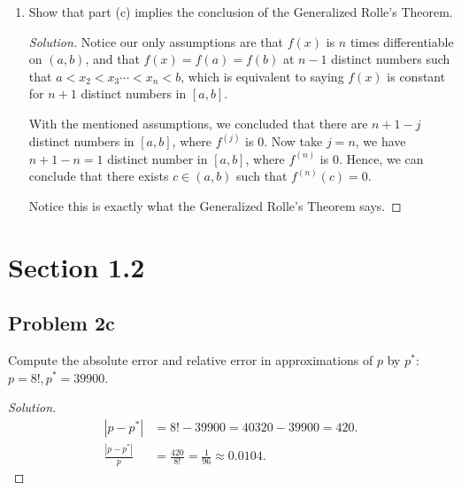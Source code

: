 \documentclass{article}
\begin{document}
\begin{enumerate}[label=\alph*.]
\begin{proof}[Solution]
        Hence, by induction, we can conclude that for each $j = 1, 2, \dots, n$, there are $n+1-j$
        distinct numbers in $[a,b]$, where $f^{(j)}$ is 0.
    \end{proof}

    \item  Show that part (c) implies the conclusion of the Generalized Rolle's Theorem.
    
    \begin{proof}[Solution]
        Notice our only assumptions are that $f(x)$ is $n$ times differentiable on $(a, b)$, and that 
        $f(x) = f(a) = f(b)$ at $n - 1$ distinct numbers such that $a < x_2 < x_3 \cdots < x_n < b$, 
        which is equivalent to saying $f(x)$ is constant for $n+1$ distinct numbers in $[a,b]$. 

        With the mentioned assumptions, we concluded that there are $n+1-j$ distinct numbers in 
        $[a,b]$, where $f^{(j)}$ is 0. Now take $j = n$, we have $n+1-n = 1$ distinct number in 
        $[a,b]$, where $f^{(n)}$ is 0. Hence, we can conclude that there exists $c \in (a,b)$ such 
        that $f^{(n)}(c) = 0$.

        Notice this is exactly what the Generalized Rolle's Theorem says.
    \end{proof}


\end{enumerate}

\section*{Section 1.2}
\subsection*{Problem 2c}
Compute the absolute error and relative error in approximations of $p$ by $p^*$: $p = 8!, p^* = 
39900$.

\begin{proof}[Solution]
    \begin{align*}
        |p - p^*| & = 8! - 39900 = 40320 - 39900 = 420. \\
        \frac{|p-p^*|}{p} & = \frac{420}{8!} =\frac{1}{96} \approx 0.0104.
    \end{align*}
\end{proof}
\end{document}

